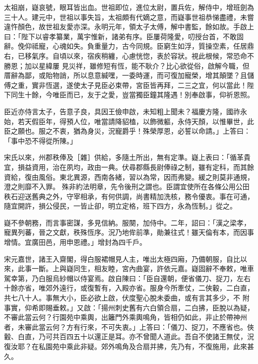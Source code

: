 \begin{pinyinscope}
 太祖崩，嶷哀號，眼耳皆出血。世祖即位，進位太尉，置兵佐，解侍中，增班劍為三十人。建元中，世祖以事失旨，太祖頗有代嫡之意，而嶷事世祖恭悌盡禮，未嘗違忤顏色，故世祖友愛亦深。永明元年，領太子太傅，解中書監，餘如故。手啟上曰：「陛下以睿孝纂業，萬宇惟新，諸弟有序。臣屢荷隆愛，叨授台首，不敢固辭。俛仰祗寵，心魂如失。負重量力，古今同規。臣窮生如浮，質操空素，任居鼎右，已移氣序。自頃以來，宿疾稍纏，心慮恍惚，表於容狀。視此根候，常恐命不勝恩；加以星緯屢
 見災祥，雖修短有恆，能不耿介？比心欲從俗，啟解今職，但厝辭為鄙，或貽物誚，所以息意緘嘿，一委時運，而可復加寵榮，增其顛墜？且儲傅之重，實非恆選，遂使太子見臣必束帶，宮臣皆再拜，二三之宜，何以當此！陛下同生十餘，今唯臣而已，友于之愛，豈當獨臣鐘其隆遇！別奉啟事，仰祈恩照。



 臣近亦侍言太子，告意子良，具因王儉申啟，未知粗上聞未？福慶方隆，國祚永始，若天假臣年，得預人位，唯當請降貂榼，以飾微軀，永侍天顏，以惟畢世，此臣之願也。服之不衷，猶為身災，況寵爵乎！殊榮厚恩，必誓以命請。」上答曰：「事中恐不得從所陳。」



 宋氏以來，州郡秩俸及［雜］供給，多隨土所出，無有定準。嶷上表曰：「循革貴宜，損益資用，治在夙均，政由一典。伏尋郡縣長尉俸祿之制，雖有定科，而其餘資給，復由風俗。東北異源，西南各緒，習以為常，因而弗變。緩之則莫非通規，澄之則靡不入罪。
 殊非約法明章，先令後刑之謂也。臣謂宜使所在各條公用公田秩石迎送舊典之外，守宰相承，有何供調，尚書精加洗核，務令優衷。事在可通，隨宜開許，損公侵民，一皆止卻，明立定格，班下四方，永為恆制。」從之。



 嶷不參朝務，而言事密謀，多見信納。服闋，加侍中。二年，詔曰：「漢之梁孝，寵異列蕃，晉之文獻，秩殊恆序。況乃地侔前準，勛兼往式！雖天倫有本，而因事增情。宜廣田邑，用申恩禮。」增封為四千戶。



 宋元嘉世，諸王入齋閣，得白服裙帽見人主，唯出太極四廂，乃備朝服，自比以來，此事一斷。上與嶷同生，相友睦，宮內曲宴，許依元嘉。嶷固辭不奉敕，唯車駕幸第，乃白服烏紗帽以侍宴焉。啟自陳曰：「臣自還朝，便省儀刀、捉刀，左右十餘亦省，唯郊外遠行，或復暫有，入殿亦省。服身今所牽仗，二俠轂，二白直，共七八十人。事無大小，臣必欲上啟，伏度聖心脫未委曲，或有言其多少，不
 附事實，仰希即賜垂敕。」又啟：「揚州刺史舊有六白領合扇，二白拂，臣脫以為疑，不審此當云何？行園苑中乘輿，出籬門外乘輿鳴角，皆相仍如此，非止於帶神州者，未審此當云何？方有行來，不可失衷。」上答曰：「儀刀、捉刀，不應省也。俠轂、白直，乃可共百四五十以還正是耳。亦不曾聞人道此。吾自不使諸王無仗，況復汝耶？在私園苑中乘此非疑。郊外鳴角及合扇并拂，先乃有，不復施用，此來甚久。




\end{pinyinscope}
